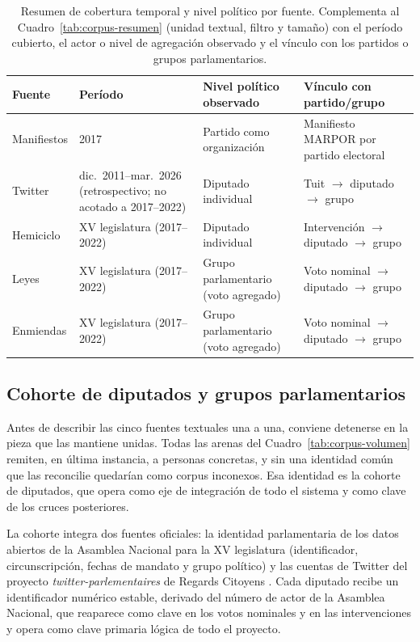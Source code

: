 \begin{table}[H]
\centering
\caption{Resumen de cobertura temporal y nivel político por fuente. Complementa al
Cuadro~\ref{tab:corpus-resumen} (unidad textual, filtro y tamaño) con el período
cubierto, el actor o nivel de agregación observado y el vínculo con los partidos o
grupos parlamentarios.}
\label{tab:corpus-cobertura}
\footnotesize
\setlength{\tabcolsep}{4pt}
\renewcommand{\arraystretch}{1.15}
\begin{tabularx}{\textwidth}{@{}l Z Z Z@{}}
\toprule
\textbf{Fuente} & \textbf{Período} & \textbf{Nivel político observado} & \textbf{Vínculo con partido/grupo} \\
\midrule
Manifiestos & 2017 & Partido como organización & Manifiesto MARPOR por partido electoral \\
Twitter & dic.\ 2011--mar.\ 2026 (retrospectivo; no acotado a 2017--2022) & Diputado individual & Tuit $\rightarrow$ diputado $\rightarrow$ grupo \\
Hemiciclo & XV legislatura (2017--2022) & Diputado individual & Intervención $\rightarrow$ diputado $\rightarrow$ grupo \\
Leyes & XV legislatura (2017--2022) & Grupo parlamentario (voto agregado) & Voto nominal $\rightarrow$ diputado $\rightarrow$ grupo \\
Enmiendas & XV legislatura (2017--2022) & Grupo parlamentario (voto agregado) & Voto nominal $\rightarrow$ diputado $\rightarrow$ grupo \\
\bottomrule
\end{tabularx}
\end{table}

\subsection{Cohorte de diputados y grupos parlamentarios}
\label{sec:datos-diputados}

Antes de describir las cinco fuentes textuales una a una, conviene detenerse en la
pieza que las mantiene unidas. Todas las arenas del Cuadro~\ref{tab:corpus-volumen}
remiten, en última instancia, a personas concretas, y sin una identidad común que
las reconcilie quedarían como corpus inconexos. Esa identidad es la cohorte de
diputados, que opera como eje de integración de todo el sistema y como clave de
los cruces posteriores.

La cohorte integra dos fuentes oficiales: la identidad parlamentaria de los datos
abiertos de la Asamblea Nacional para la XV legislatura \cite{an_opendata_xv}
(identificador, circunscripción, fechas de mandato y grupo político) y las
cuentas de Twitter del proyecto \emph{twitter-parlementaires} de Regards Citoyens
\cite{regardscitoyens_twitter}. Cada diputado recibe un identificador numérico
estable, derivado del número de actor de la Asamblea Nacional, que reaparece como
clave en los votos nominales y en las intervenciones y opera como clave primaria
lógica de todo el proyecto.

